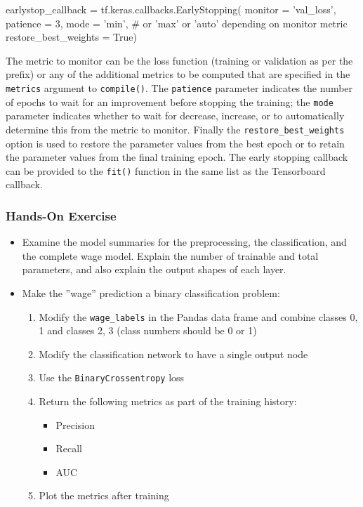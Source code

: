\begin{samepage}
\begin{pythoncode}
earlystop_callback = tf.keras.callbacks.EarlyStopping(
    monitor = 'val_loss',
    patience = 3,
    mode = 'min', # or 'max' or 'auto' depending on monitor metric
    restore_best_weights = True)
\end{pythoncode}
\end{samepage}

The metric to monitor can be the loss function (training or validation as per the prefix) or any of the additional metrics to be computed that are specified in the \texttt{metrics} argument to \texttt{compile()}. The \texttt{patience} parameter indicates the number of epochs to wait for an improvement before stopping the training; the \texttt{mode} parameter indicates whether to wait for decrease, increase, or to automatically determine this from the metric to monitor. Finally the \texttt{restore\_best\_weights} option is used to restore the parameter values from the best epoch or to retain the parameter values from the final training epoch. The early stopping callback can be provided to the \texttt{fit()} function in the same list as the Tensorboard callback.

\begin{tcolorbox}[colback=code]
\subsubsection*{Hands-On Exercise} 
\begin{itemize}
   \item Examine the model summaries for the preprocessing, the classification, and the complete wage model. Explain the number of trainable and total parameters, and also explain the output shapes of each layer.
   \item Make the ''wage'' prediction a binary classification problem:
   \begin{enumerate}
      \item Modify the \texttt{wage\_labels} in the Pandas data frame and combine classes 0, 1 and classes 2, 3 (class numbers should be 0 or 1)
      \item Modify the classification network to have a single output node
      \item Use the \texttt{BinaryCrossentropy} loss
      \item Return the following metrics as part of the training history:
      \begin{itemize}
          \item Precision
          \item Recall
          \item AUC
      \end{itemize}
      \item Plot the metrics after training
   \end{enumerate}
\end{itemize}
\end{tcolorbox}


